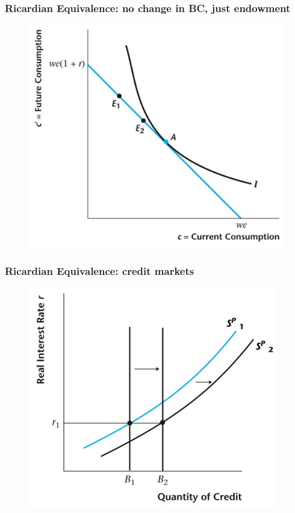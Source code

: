 \documentclass{beamer}
\begin{document}
\begin{frame}
\frametitle[alignment=center]{Ricardian Equivalence: no change in BC, just endowment}
\begin{figure}
\centering
\includegraphics[scale=0.5]{Figures/W_Fig_9pt16.png}
\end{figure}
\end{frame}

\begin{frame}
\frametitle[alignment=center]{Ricardian Equivalence: credit markets}
\begin{figure}
\centering
\includegraphics[scale=0.5]{Figures/W_Fig_9pt17.png}
\end{figure}
\end{frame}
\end{document}
